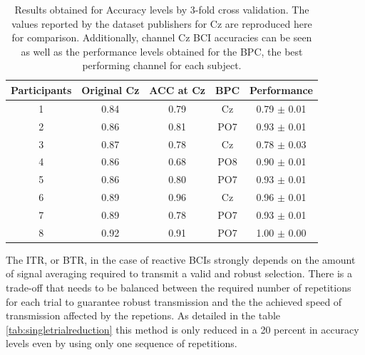 \documentclass[entropy,article,submit,moreauthors,pdftex,10pt,a4paper]{mdpi}
\begin{document}

\begin{table}[H]
\caption{Results obtained for Accuracy levels by 3-fold cross validation. The values reported by the dataset publishers for Cz are reproduced here for comparison. Additionally, channel Cz BCI accuracies can be seen as well as the performance levels obtained for the BPC, the best performing channel for each subject.}
\centering
\begin{tabular}{ccccc}
\toprule
\textbf{Participants}	& \textbf{Original Cz}	& \textbf{ACC at Cz}	& \textbf{BPC}	& \textbf{Performance}\\
\midrule
1     &   0.84 &   0.79 & Cz  &   0.79 $\pm$ 0.01 \\
2     &   0.86 &   0.81 & PO7 &   0.93 $\pm$ 0.01 \\
3     &   0.87 &   0.78 & Cz  &   0.78 $\pm$ 0.03 \\
4     &   0.86 &   0.68 & PO8 &   0.90 $\pm$ 0.01 \\
5     &   0.86 &   0.80 & PO7 &   0.93 $\pm$ 0.01 \\
6     &   0.89 &   0.96 & Cz  &   0.96 $\pm$ 0.01 \\
7     &   0.89 &   0.78 & PO7 &   0.93 $\pm$ 0.01 \\
8     &   0.92 &   0.91 & PO7 &   1.00 $\pm$ 0.00 \\
\bottomrule
\end{tabular}
\label{tab:results}
\end{table}

The ITR, or BTR, in the case of reactive BCIs \citep{WolpawJonathanR2012} strongly depends on the amount of signal averaging required to transmit a valid and robust selection.  There is a trade-off that needs to be balanced between the required number of repetitions for each trial to guarantee robust transmission and the the achieved speed of transmission affected by the repetions.  As detailed in the table \ref{tab:singletrialreduction} this method is only reduced in a 20 percent in accuracy levels even by using only one sequence of repetitions.
\end{document}
